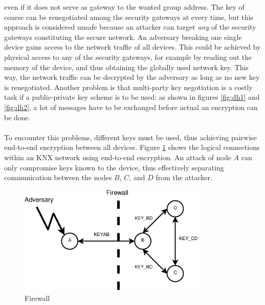 even if it does not serve as gateway to the wanted group address. 
The key of course can be renegotiated among the security gateways at every time, but this approach is considered
unsafe because an attacker can target \textit{any} of the security gateways constituting the secure network. An adversary breaking one single device gains
access to the network traffic of all devices. This could be achieved by physical access to any of the security gateways, for example by reading out the
memory of the device, and thus obtaining the globally used network key. This way, the network traffic can be decrypted by the adversary as long as no new
key is renegotiated. Another problem is that multi-party key negotiation is a costly task if a public-private key scheme
is to be used: as shown in figures \ref{fig:dh1} and \ref{fig:dh2}, a lot of messages have to be exchanged before actual an encryption can be done. 
\\
\\
To encounter this problems, different keys must be used, thus achieving pairwise end-to-end encryption between all devices. 
Figure \ref{fig:firewall} shows the logical connections within an KNX network using end-to-end encryption. An 
attack of node $A$ can only compromise keys known to the device, thus effectively separating communication between the nodes $B$, $C$, and $D$ from
the attacker. 
\begin{figure}
    \includegraphics[width=0.8\textwidth]{figures/firewall2.eps}
% 
 \caption{Firewall}
 \label{fig:firewall}
\end{figure}
